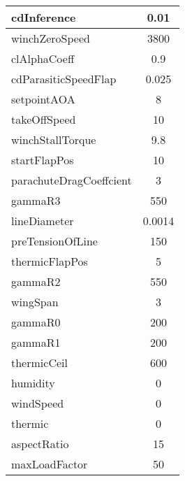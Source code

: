 \begin{center}
\begin{tabular}{|l|c|}
cdInference & 0.01 \\ \hline 

winchZeroSpeed & 3800 \\ \hline 

clAlphaCoeff & 0.9 \\ \hline 

cdParasiticSpeedFlap & 0.025 \\ \hline 

setpointAOA & 8 \\ \hline 

takeOffSpeed & 10 \\ \hline 

winchStallTorque & 9.8 \\ \hline 

startFlapPos & 10 \\ \hline 

parachuteDragCoeffcient & 3 \\ \hline 

gammaR3 & 550 \\ \hline 

lineDiameter & 0.0014 \\ \hline 

preTensionOfLine & 150 \\ \hline 

thermicFlapPos & 5 \\ \hline 

gammaR2 & 550 \\ \hline 

wingSpan & 3 \\ \hline 

gammaR0 & 200 \\ \hline 

gammaR1 & 200 \\ \hline 

thermicCeil & 600 \\ \hline 

humidity & 0 \\ \hline 

windSpeed & 0 \\ \hline 

thermic & 0 \\ \hline 

aspectRatio & 15 \\ \hline 

maxLoadFactor & 50 \\ \hline 

            \end{tabular}

        \end{center}

